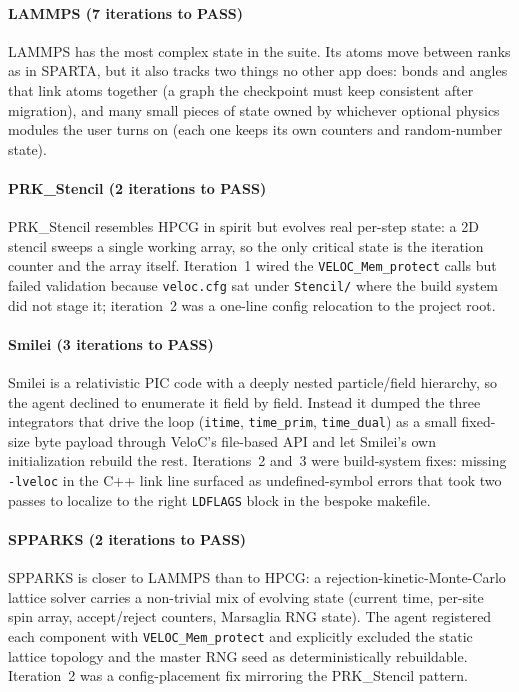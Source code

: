 \documentclass[conference]{IEEEtran}
\begin{document}
\paragraph{LAMMPS (7 iterations to PASS)}
LAMMPS has the most complex state in the suite. Its atoms move between ranks as in SPARTA, but it also tracks two things no other app does: bonds and angles that link atoms together (a graph the checkpoint must keep consistent after migration), and many small pieces of state owned by whichever optional physics modules the user turns on (each one keeps its own counters and random-number state).

\paragraph{PRK\_Stencil (2 iterations to PASS)}
PRK\_Stencil resembles HPCG in spirit but evolves real per-step state: a 2D stencil sweeps a single working array, so the only critical state is the iteration counter and the array itself. Iteration~1 wired the \texttt{VELOC\_Mem\_protect} calls but failed validation because \texttt{veloc.cfg} sat under \texttt{Stencil/} where the build system did not stage it; iteration~2 was a one-line config relocation to the project root.

\paragraph{Smilei (3 iterations to PASS)}
Smilei is a relativistic PIC code with a deeply nested particle/field hierarchy, so the agent declined to enumerate it field by field. Instead it dumped the three integrators that drive the loop (\texttt{itime}, \texttt{time\_prim}, \texttt{time\_dual}) as a small fixed-size byte payload through VeloC's file-based API and let Smilei's own initialization rebuild the rest. Iterations~2 and~3 were build-system fixes: missing \texttt{-lveloc} in the C++ link line surfaced as undefined-symbol errors that took two passes to localize to the right \texttt{LDFLAGS} block in the bespoke makefile.

\paragraph{SPPARKS (2 iterations to PASS)}
SPPARKS is closer to LAMMPS than to HPCG: a rejection-kinetic-Monte-Carlo lattice solver carries a non-trivial mix of evolving state (current time, per-site spin array, accept/reject counters, Marsaglia RNG state). The agent registered each component with \texttt{VELOC\_Mem\_protect} and explicitly excluded the static lattice topology and the master RNG seed as deterministically rebuildable. Iteration~2 was a config-placement fix mirroring the PRK\_Stencil pattern.
\end{document}

